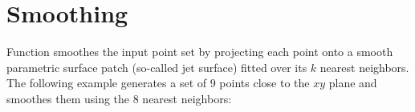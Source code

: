 \section{Smoothing}

Function  smoothes the input point set by projecting each point onto a smooth parametric surface patch (so-called jet surface) fitted over its $k$ nearest neighbors.\\


The following example generates a set of 9 points close to the $xy$ plane and smoothes them using the 8 nearest neighbors:
